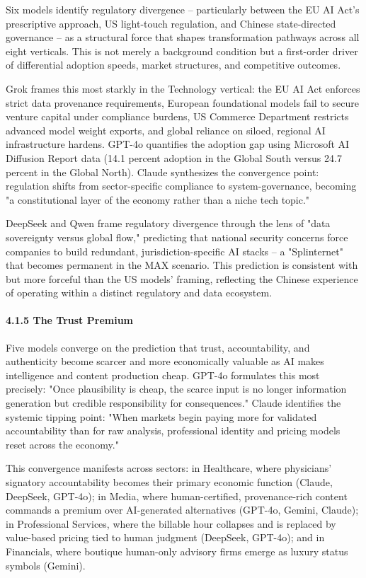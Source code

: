 \documentclass{article}
\begin{document}
Six models identify regulatory divergence -- particularly between the EU AI Act's prescriptive approach, US light-touch regulation, and Chinese state-directed governance -- as a structural force that shapes transformation pathways across all eight verticals. This is not merely a background condition but a first-order driver of differential adoption speeds, market structures, and competitive outcomes.

Grok frames this most starkly in the Technology vertical: the EU AI Act enforces strict data provenance requirements, European foundational models fail to secure venture capital under compliance burdens, US Commerce Department restricts advanced model weight exports, and global reliance on siloed, regional AI infrastructure hardens. GPT-4o quantifies the adoption gap using Microsoft AI Diffusion Report data (14.1 percent adoption in the Global South versus 24.7 percent in the Global North). Claude synthesizes the convergence point: regulation shifts from sector-specific compliance to system-governance, becoming "a constitutional layer of the economy rather than a niche tech topic."

DeepSeek and Qwen frame regulatory divergence through the lens of "data sovereignty versus global flow," predicting that national security concerns force companies to build redundant, jurisdiction-specific AI stacks -- a "Splinternet" that becomes permanent in the MAX scenario. This prediction is consistent with but more forceful than the US models' framing, reflecting the Chinese experience of operating within a distinct regulatory and data ecosystem.


\paragraph{4.1.5 The Trust Premium}

Five models converge on the prediction that trust, accountability, and authenticity become scarcer and more economically valuable as AI makes intelligence and content production cheap. GPT-4o formulates this most precisely: "Once plausibility is cheap, the scarce input is no longer information generation but credible responsibility for consequences." Claude identifies the systemic tipping point: "When markets begin paying more for validated accountability than for raw analysis, professional identity and pricing models reset across the economy."

This convergence manifests across sectors: in Healthcare, where physicians' signatory accountability becomes their primary economic function (Claude, DeepSeek, GPT-4o); in Media, where human-certified, provenance-rich content commands a premium over AI-generated alternatives (GPT-4o, Gemini, Claude); in Professional Services, where the billable hour collapses and is replaced by value-based pricing tied to human judgment (DeepSeek, GPT-4o); and in Financials, where boutique human-only advisory firms emerge as luxury status symbols (Gemini).
\end{document}
